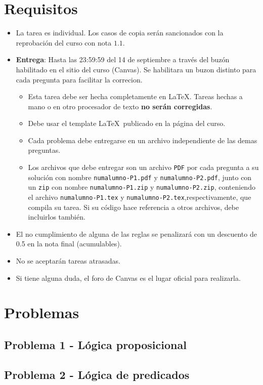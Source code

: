 \documentclass[12pt]{article}
\begin{document}
\section*{Requisitos}
\begin{itemize}

  \item La tarea es individual. Los casos de copia serán sancionados con la
   reprobación del curso con nota $1.1$.

  \item \textbf{Entrega}: Hasta las 23:59:59 del 14 de septiembre a través del buzón habilitado en el sitio del curso (Canvas).
  Se habilitara un buzon distinto para cada pregunta para facilitar la correcion.

  \begin{itemize}

    \item Esta tarea debe ser hecha completamente en \LaTeX. Tareas hechas a mano o
    en otro procesador de texto \textbf{no serán corregidas}.

    \item Debe usar el template \LaTeX\ publicado en la página del curso.

    \item Cada problema debe entregarse en un archivo independiente de las demas preguntas.
    

    \item Los archivos que debe entregar son un archivo \texttt{PDF} por cada pregunta
    a su solución con nombre \texttt{numalumno-P1.pdf} y \texttt{numalumno-P2.pdf}, 
    junto con un \texttt{zip} con nombre \texttt{numalumno-P1.zip} y \texttt{numalumno-P2.zip}, 
    conteniendo el archivo \texttt{numalumno-P1.tex} y \texttt{numalumno-P2.tex},respectivamente, 
    que compila su tarea. 
    Si su código hace referencia a otros archivos, debe incluirlos también.


  \end{itemize}

  \item El no cumplimiento de alguna de las reglas se penalizará con un descuento de 0.5 en la nota final (acumulables).

  \item No se aceptarán tareas atrasadas.

  \item Si tiene alguna duda, el foro de Canvas es el lugar oficial para realizarla.
\end{itemize}



\section*{Problemas}

    \subsection*{Problema 1 - Lógica proposicional}
      
    \newpage
     \subsection*{Problema 2 - Lógica de predicados}
      
\end{document}
